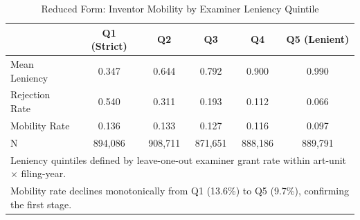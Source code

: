 \begin{table}[t]
\centering
\caption{Reduced Form: Inventor Mobility by Examiner Leniency Quintile}
\label{tab:quintile}
\begin{tabular}{lccccc}
\hline\hline
 & Q1 (Strict) & Q2 & Q3 & Q4 & Q5 (Lenient) \\
\hline
Mean Leniency & 0.347 & 0.644 & 0.792 & 0.900 & 0.990 \\
Rejection Rate & 0.540 & 0.311 & 0.193 & 0.112 & 0.066 \\
Mobility Rate & 0.136 & 0.133 & 0.127 & 0.116 & 0.097 \\
N & 894,086 & 908,711 & 871,651 & 888,186 & 889,791 \\
\hline
\multicolumn{6}{l}{\footnotesize Leniency quintiles defined by leave-one-out examiner grant rate within art-unit $\times$ filing-year.} \\
\multicolumn{6}{l}{\footnotesize Mobility rate declines monotonically from Q1 (13.6\%) to Q5 (9.7\%), confirming the first stage.} \\
\hline\hline
\end{tabular}
\end{table}
